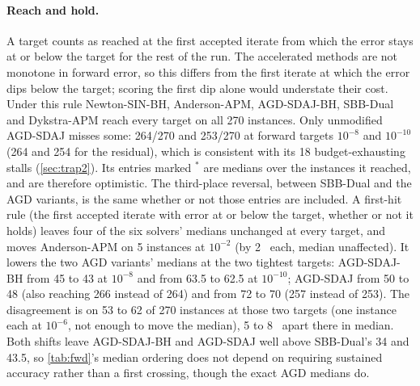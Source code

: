 \paragraph{Reach and hold.}
A target counts as reached at the first accepted iterate from which the error
stays at or below the target for the rest of the run. The accelerated methods
are not monotone in forward error, so this differs from the first iterate at
which the error dips below the target; scoring the first dip alone would
understate their cost. Under this rule Newton-SIN-BH, Anderson-APM,
AGD-SDAJ-BH, SBB-Dual and Dykstra-APM reach every target on all 270
instances. Only unmodified
AGD-SDAJ misses some: 264/270 and 253/270 at forward targets $10^{-8}$ and
$10^{-10}$ (264 and 254 for the residual), which is consistent with its 18
budget-exhausting stalls (\cref{sec:trap2}). Its entries marked $^{*}$ are
medians over the instances it reached, and are therefore optimistic. The
third-place reversal, between SBB-Dual and the AGD variants, is the same
whether or not those entries are
included. A first-hit rule (the first accepted iterate with error at or below
the target, whether or not it holds) leaves four of the six solvers'
medians unchanged at every target, and moves Anderson-APM on 5 instances at
$10^{-2}$ (by 2 \EVDs\ each, median unaffected). It lowers the two AGD
variants' medians at the two tightest targets: AGD-SDAJ-BH from 45 to 43 at
$10^{-8}$ and from 63.5 to 62.5 at $10^{-10}$; AGD-SDAJ from 50 to 48 (also
reaching 266 instead of 264) and from 72 to 70 (257 instead of 253). The
disagreement is on 53 to 62 of 270 instances at those two targets (one
instance each at $10^{-6}$, not enough to move the median), 5 to 8 \EVDs\
apart there in median. Both shifts leave AGD-SDAJ-BH and
AGD-SDAJ well above SBB-Dual's 34 and 43.5, so \cref{tab:fwd}'s median
ordering does not depend on requiring sustained accuracy rather than a first
crossing, though the exact AGD medians do.
